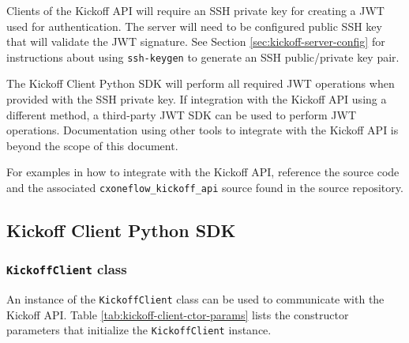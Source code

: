 Clients of the Kickoff API will require an SSH private key for creating a JWT used for authentication.
The \cxoneflow server will need to be configured public SSH key that will validate the JWT signature.
See Section \ref{sec:kickoff-server-config} for instructions about using \texttt{ssh-keygen} to generate
an SSH public/private key pair.

The Kickoff Client Python SDK will perform all required JWT operations when provided with the SSH
private key.  If integration with the Kickoff API using a different method, a third-party JWT
SDK can be used to perform JWT operations.  Documentation using other tools to integrate with
the Kickoff API is beyond the scope of this document.

For examples in how to integrate with the Kickoff API, reference the \cxoneflowaudit source code
and the associated \texttt{cxoneflow\_kickoff\_api} source found in the \cxoneflow source repository.

\subsection{Kickoff Client Python SDK}\label{sec:kickoff-sdk}

\subsubsection{\texttt{KickoffClient} class}

An instance of the \texttt{KickoffClient} class can be used to communicate with
the \cxoneflow Kickoff API.  Table \ref{tab:kickoff-client-ctor-params} lists the
constructor parameters that initialize the \texttt{KickoffClient} instance.

